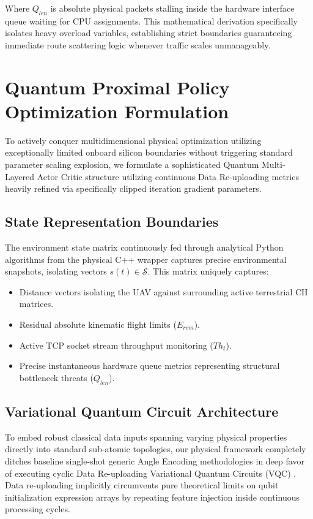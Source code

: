 \documentclass[conference]{IEEEtran}
\begin{document}
Where $Q_{len}$ is absolute physical packets stalling inside the hardware interface queue waiting for CPU assignments. This mathematical derivation specifically isolates heavy overload variables, establishing strict boundaries guaranteeing immediate route scattering logic whenever traffic scales unmanageably.

\section{Quantum Proximal Policy Optimization Formulation}

To actively conquer multidimensional physical optimization utilizing exceptionally limited onboard silicon boundaries without triggering standard parameter scaling explosion, we formulate a sophisticated Quantum Multi-Layered Actor Critic structure utilizing continuous Data Re-uploading metrics heavily refined via specifically clipped iteration gradient parameters.

\subsection{State Representation Boundaries}
The environment state matrix continuously fed through analytical Python algorithms from the physical C++ wrapper captures precise environmental snapshots, isolating vectors $s(t) \in \mathcal{S}$. This matrix uniquely captures: 
\begin{itemize}
    \item Distance vectors isolating the UAV against surrounding active terrestrial CH matrices.
    \item Residual absolute kinematic flight limits ($E_{rem}$).
    \item Active TCP socket stream throughput monitoring ($Th_t$).
    \item Precise instantaneous hardware queue metrics representing structural bottleneck threats ($Q_{len}$).
\end{itemize}

\subsection{Variational Quantum Circuit Architecture}
To embed robust classical data inputs spanning varying physical properties directly into standard sub-atomic topologies, our physical framework completely ditches baseline single-shot generic Angle Encoding methodologies in deep favor of executing cyclic Data Re-uploading Variational Quantum Circuits (VQC) \cite{perez2020}. Data re-uploading implicitly circumvents pure theoretical limits on qubit initialization expression arrays by repeating feature injection inside continuous processing cycles.
\end{document}

